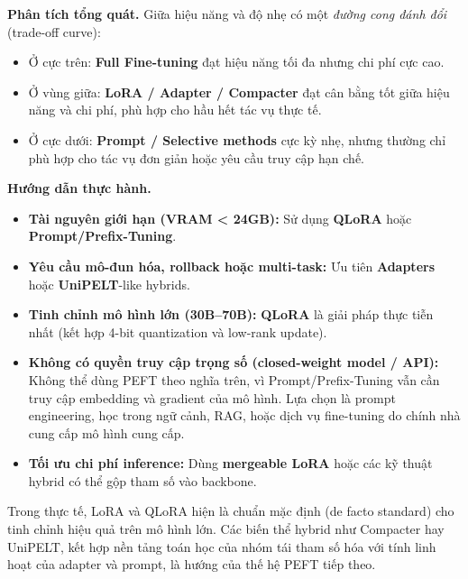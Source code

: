 \textbf{Phân tích tổng quát.}
Giữa hiệu năng và độ nhẹ có một \emph{đường cong đánh đổi} (trade-off curve):
\begin{itemize}
	\item Ở cực trên: \textbf{Full Fine-tuning} đạt hiệu năng tối đa nhưng chi phí cực cao.  
	\item Ở vùng giữa: \textbf{LoRA / Adapter / Compacter} đạt cân bằng tốt giữa hiệu năng và chi phí, phù hợp cho hầu hết tác vụ thực tế.  
	\item Ở cực dưới: \textbf{Prompt / Selective methods} cực kỳ nhẹ, nhưng thường chỉ phù hợp cho tác vụ đơn giản hoặc yêu cầu truy cập hạn chế.  
\end{itemize}

\textbf{Hướng dẫn thực hành.}
\begin{itemize}
	\item \textbf{Tài nguyên giới hạn (VRAM < 24GB):} Sử dụng \textbf{QLoRA} hoặc \textbf{Prompt/Prefix-Tuning}.  
	\item \textbf{Yêu cầu mô-đun hóa, rollback hoặc multi-task:} Ưu tiên \textbf{Adapters} hoặc \textbf{UniPELT}-like hybrids.  
	\item \textbf{Tinh chỉnh mô hình lớn (30B–70B):} \textbf{QLoRA} là giải pháp thực tiễn nhất (kết hợp 4-bit quantization và low-rank update).  
	\item \textbf{Không có quyền truy cập trọng số (closed-weight model / API):} Không thể dùng PEFT theo nghĩa trên, vì Prompt/Prefix-Tuning vẫn cần truy cập embedding và gradient của mô hình. Lựa chọn là prompt engineering, học trong ngữ cảnh, RAG, hoặc dịch vụ fine-tuning do chính nhà cung cấp mô hình cung cấp.
	\item \textbf{Tối ưu chi phí inference:} Dùng \textbf{mergeable LoRA} hoặc các kỹ thuật hybrid có thể gộp tham số vào backbone.  
\end{itemize}

Trong thực tế, LoRA và QLoRA hiện là chuẩn mặc định (de facto standard) cho tinh chỉnh hiệu quả trên mô hình lớn. Các biến thể hybrid như Compacter hay UniPELT, kết hợp nền tảng toán học của nhóm tái tham số hóa với tính linh hoạt của adapter và prompt, là hướng của thế hệ PEFT tiếp theo.

